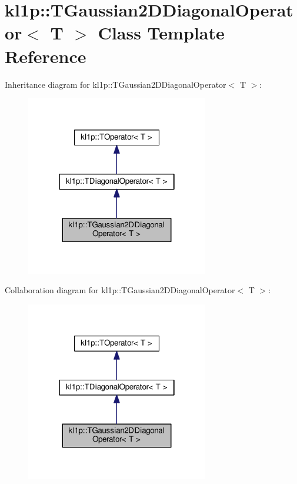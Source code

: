 \hypertarget{classkl1p_1_1TGaussian2DDiagonalOperator}{}\section{kl1p\+:\+:T\+Gaussian2\+D\+Diagonal\+Operator$<$ T $>$ Class Template Reference}
\label{classkl1p_1_1TGaussian2DDiagonalOperator}


Inheritance diagram for kl1p\+:\+:T\+Gaussian2\+D\+Diagonal\+Operator$<$ T $>$\+:
\nopagebreak
\begin{figure}[H]
\begin{center}
\leavevmode
\includegraphics[width=226pt]{classkl1p_1_1TGaussian2DDiagonalOperator__inherit__graph}
\end{center}
\end{figure}


Collaboration diagram for kl1p\+:\+:T\+Gaussian2\+D\+Diagonal\+Operator$<$ T $>$\+:
\nopagebreak
\begin{figure}[H]
\begin{center}
\leavevmode
\includegraphics[width=226pt]{classkl1p_1_1TGaussian2DDiagonalOperator__coll__graph}
\end{center}
\end{figure}
